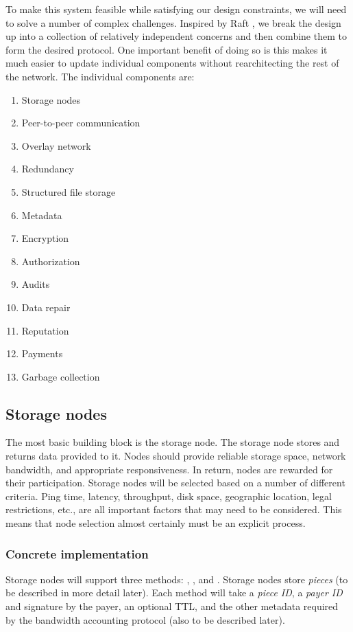 \documentclass[a4paper,10pt]{article} \usepackage[utf8]{inputenc}
\begin{document}
To make this system feasible while satisfying our design constraints, we will
need to solve a number of complex challenges. Inspired by Raft \cite{raft}, we
break the design up into a collection of relatively independent concerns and
then combine them to form the desired protocol. One important benefit of doing
so is this makes it much easier to update individual components without
rearchitecting the rest of the network. The individual components are:

\begin{enumerate}
\item Storage nodes
\item Peer-to-peer communication
\item Overlay network
\item Redundancy
\item Structured file storage
\item Metadata
\item Encryption
\item Authorization
\item Audits
\item Data repair
\item Reputation
\item Payments
\item Garbage collection
\end{enumerate}

\subsection{Storage nodes}

The most basic building block is the storage node. The storage node stores and
returns data provided to it. Nodes should provide reliable storage space,
network bandwidth, and appropriate responsiveness. In return, nodes are rewarded
for their participation. Storage nodes will be selected based on a number of
different criteria. Ping time, latency, throughput, disk space, geographic
location, legal restrictions, etc., are all important factors that may need to
be considered. This means that node selection almost certainly must be an
explicit process.

\subsubsection{Concrete implementation}

Storage nodes will support three methods: , , and
. Storage nodes store {\em pieces} (to be described in more detail
later). Each method will take a {\em piece ID}, a {\em payer ID} and signature
by the payer, an optional TTL, and the other metadata required by the bandwidth
accounting protocol (also to be described later).
\end{document}
